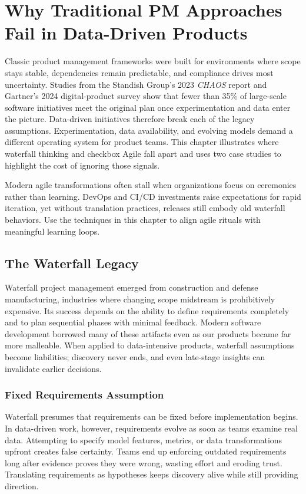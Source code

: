 \chapter{Why Traditional PM Approaches Fail in Data-Driven Products}
\label{ch:traditional-pm-failures}

Classic product management frameworks were built for environments where scope stays stable, dependencies remain predictable, and compliance drives most uncertainty. Studies from the Standish Group’s 2023 \textit{CHAOS} report and Gartner’s 2024 digital-product survey show that fewer than 35\% of large-scale software initiatives meet the original plan once experimentation and data enter the picture. Data-driven initiatives therefore break each of the legacy assumptions. Experimentation, data availability, and evolving models demand a different operating system for product teams. This chapter illustrates where waterfall thinking and checkbox Agile fall apart and uses two case studies to highlight the cost of ignoring those signals.

Modern agile transformations often stall when organizations focus on ceremonies rather than learning. DevOps and CI/CD investments raise expectations for rapid iteration, yet without translation practices, releases still embody old waterfall behaviors. Use the techniques in this chapter to align agile rituals with meaningful learning loops.

\section{The Waterfall Legacy}
\label{sec:waterfall-legacy}

Waterfall project management emerged from construction and defense manufacturing, industries where changing scope midstream is prohibitively expensive. Its success depends on the ability to define requirements completely and to plan sequential phases with minimal feedback. Modern software development borrowed many of these artifacts even as our products became far more malleable. When applied to data-intensive products, waterfall assumptions become liabilities; discovery never ends, and even late-stage insights can invalidate earlier decisions.

\subsection{Fixed Requirements Assumption}
Waterfall presumes that requirements can be fixed before implementation begins. In data-driven work, however, requirements evolve as soon as teams examine real data. Attempting to specify model features, metrics, or data transformations upfront creates false certainty. Teams end up enforcing outdated requirements long after evidence proves they were wrong, wasting effort and eroding trust. Translating requirements as hypotheses keeps discovery alive while still providing direction.

